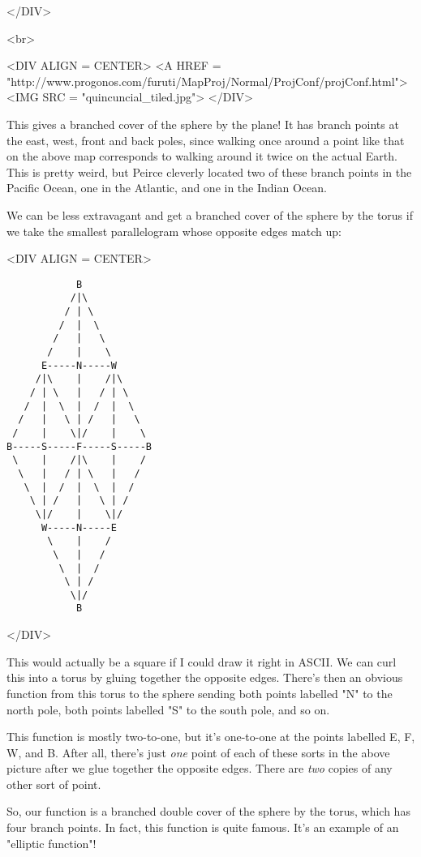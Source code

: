 </DIV>

<br>

<DIV ALIGN = CENTER>
<A HREF = 
"http://www.progonos.com/furuti/MapProj/Normal/ProjConf/projConf.html">
<IMG SRC = "quincuncial_tiled.jpg">
</DIV>

This gives a branched cover of the sphere by the plane!  It 
has branch points at the east, west, front and back poles,
since walking once around a point like that on the above map 
corresponds to walking around it twice on the actual Earth.
This is pretty weird, but Peirce cleverly located two of these
branch points in the Pacific Ocean, one in the Atlantic, and one in 
the Indian Ocean.

We can be less extravagant and get a branched cover of the 
sphere by the torus if we take the smallest parallelogram 
whose opposite edges match up:

<DIV ALIGN = CENTER>
\begin{verbatim}
            B            
           /|\           
          / | \          
         /  |  \         
        /   |   \        
       /    |    \       
      E-----N-----W      
     /|\    |    /|\     
    / | \   |   / | \    
   /  |  \  |  /  |  \   
  /   |   \ | /   |   \  
 /    |    \|/    |    \ 
B-----S-----F-----S-----B
 \    |    /|\    |    / 
  \   |   / | \   |   /  
   \  |  /  |  \  |  /   
    \ | /   |   \ | /    
     \|/    |    \|/     
      W-----N-----E      
       \    |    /       
        \   |   /        
         \  |  /         
          \ | /          
           \|/           
            B            
\end{verbatim}
    
</DIV>

This would actually be a square if I could draw it right in ASCII.
We can curl this into a torus by gluing together the opposite edges. 
There's then an obvious function from this torus to the sphere
sending both points labelled "N" to the north pole, both points 
labelled "S" to the south pole, and so on.  

This function is mostly two-to-one, but it's one-to-one at the 
points labelled E, F, W, and B.  After all, there's just \emph{one}
point of each of these sorts in the above picture after we glue 
together the opposite edges.  There are \emph{two} copies of any other 
sort of point.

So, our function is a branched double cover of the sphere by 
the torus, which has four branch points.  In fact, this function 
is quite famous.  It's an example of an "elliptic function"!   

